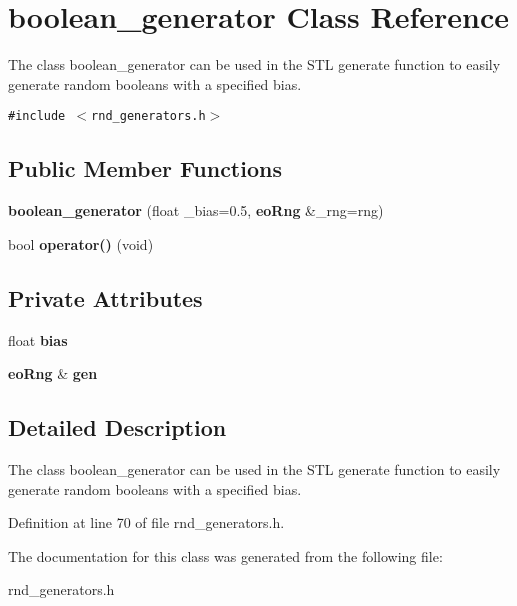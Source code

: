 \section{boolean\_\-generator Class Reference}
\label{classboolean__generator}
The class boolean\_\-generator can be used in the STL generate function to easily generate random booleans with a specified bias.  


{\tt \#include $<$rnd\_\-generators.h$>$}

\subsection*{Public Member Functions}
\begin{CompactItemize}
\item 
{\bf boolean\_\-generator} (float \_\-bias=0.5, {\bf eo\-Rng} \&\_\-rng=rng)\label{classboolean__generator_a0}

\item 
bool {\bf operator()} (void)\label{classboolean__generator_a1}

\end{CompactItemize}
\subsection*{Private Attributes}
\begin{CompactItemize}
\item 
float {\bf bias}\label{classboolean__generator_r0}

\item 
{\bf eo\-Rng} \& {\bf gen}\label{classboolean__generator_r1}

\end{CompactItemize}


\subsection{Detailed Description}
The class boolean\_\-generator can be used in the STL generate function to easily generate random booleans with a specified bias. 



Definition at line 70 of file rnd\_\-generators.h.

The documentation for this class was generated from the following file:\begin{CompactItemize}
\item 
rnd\_\-generators.h\end{CompactItemize}
